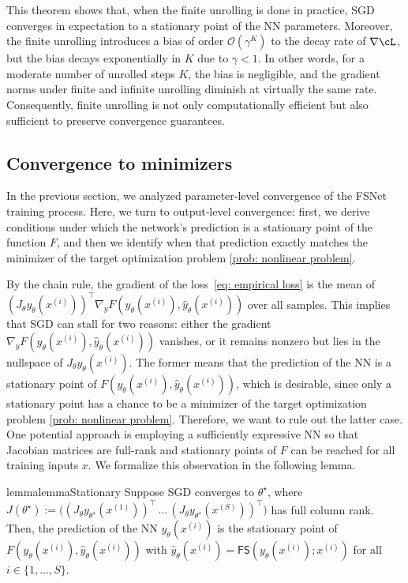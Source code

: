 \documentclass{article}
\def\FS{\mathsf{FS}}
\newcommand{\bigO}{\mathcal{O}}
\def\x{x}
\def\y{y_{\theta}}   \def\hy{\hat{y}_{\theta}}    \def\ty{\Tilde{y}}
\def\i{{(i)}}
\begin{document}
This theorem shows that, when the finite unrolling is done in practice, SGD converges in expectation to a stationary point of the NN parameters. 
Moreover, the finite unrolling introduces a bias of order $\bigO(\gamma^K)$ to the decay rate of $\nabla \cL$, but the bias decays exponentially in $K$ due to $\gamma < 1$. 
In other words, for a moderate number of unrolled steps $K$, the bias is negligible, and the gradient norms under finite and infinite unrolling diminish at virtually the same rate. 
Consequently, finite unrolling is not only computationally efficient but also sufficient to preserve convergence guarantees. 


\subsection{Convergence to minimizers}\label{subsec:minimizer convergence}
In the previous section, we analyzed parameter‐level convergence of the FSNet training process. Here, we turn to output‐level convergence: first, we derive conditions under which the network’s prediction is a stationary point of the function $F$, and then we identify when that prediction exactly matches the minimizer of the target optimization problem \eqref{prob: nonlinear problem}.

By the chain rule, the gradient of the loss~\eqref{eq: empirical loss} is the mean of $(J_\theta \y(\x^\i))^\top \nabla_y F \left(\y(\x^{(i)}) , \hy(\x^\i)\right)$ over all samples. This implies that SGD can stall for two reasons: either the gradient $\nabla_y F \left(\y(\x^{(i)}), \hy(\x^\i)\right)$ vanishes, or it remains nonzero but lies in the nullspace of $J_\theta \y(\x^\i)$. 
The former means that the prediction of the NN is a stationary point of $F \left(\y(\x^{(i)}), \hy(\x^\i)\right)$, which is desirable, since only a stationary point has a chance to be a minimizer 
of the target optimization problem \eqref{prob: nonlinear problem}. 
Therefore, we want to rule out the latter case. One potential approach is employing a sufficiently expressive NN so that Jacobian matrices are full-rank and stationary points of $F$ can be reached for all training inputs $x$.
We formalize this observation in the following lemma. 

\begin{restatable}{lemma}{lemmaStationary}\label{lemma: stationary prediction}
     Suppose SGD converges to $\theta^\star$, where 
     $J(\theta^\star) := \big((J_\theta y_{\theta^\star}(x^{(1)}))^\top \, \dots \, (J_\theta y_{\theta^\star}(x^{(S)}))^\top \big)$ has full column rank. 
     Then, the prediction of the NN $\y(\x^\i)$ is the stationary point of $F(\y(\x^\i), \hy(\x^\i))$ with $\hy(\x^\i)=\FS(\y(\x^\i); \x^\i)$ for all $i\in\{1, \dots, S\}$. 
\end{restatable}
\end{document}
